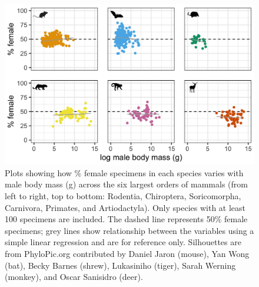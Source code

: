 \documentclass[a4paper, 12pt]{article}
\begin{document}
\begin{figure}[H]
 \centering
  \includegraphics[width = \linewidth]{figures/mass-orders-mammals.png}
  \caption{Plots showing how \% female specimens in each species varies with male body mass (g) across the six largest orders of mammals (from left to right, top to bottom: Rodentia, Chiroptera, Soricomorpha, Carnivora, Primates, and Artiodactyla). 
  Only species with at least 100 specimens are included. 
  The dashed line represents 50\% female specimens; grey lines show relationship between the variables using a simple linear regression and are for reference only. 
  Silhouettes are from PhyloPic.org contributed by Daniel Jaron (mouse), Yan Wong (bat), Becky Barnes (shrew), Lukasiniho (tiger), Sarah Werning (monkey), and Oscar Sanisidro (deer).}
  \label{fig-mammal-male-mass}
\end{figure}
\end{document}
